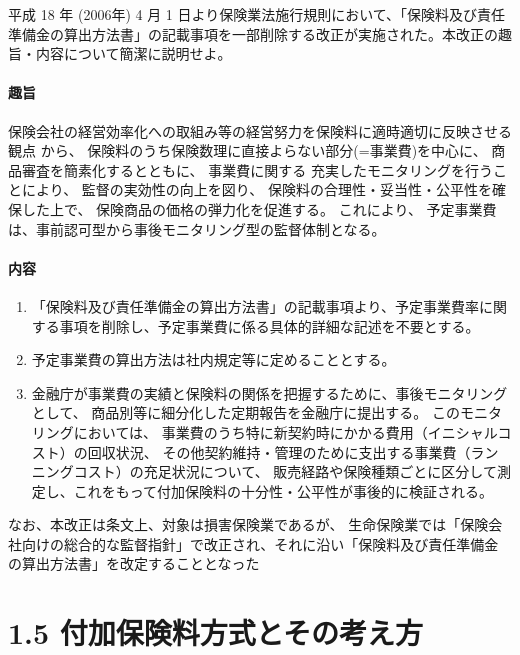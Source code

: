 \documentclass[report,gutter=10mm,fore-edge=10mm,uplatex,dvipdfmx]{jlreq}
\begin{document}

平成 18 年 (2006年) 4 月 1
日より保険業法施行規則において、「保険料及び責任準備金の算出方法書」の記載事項を一部削除する改正が実施された。本改正の趣旨・内容について簡潔に説明せよ。


\paragraph{趣旨}

  保険会社の経営効率化への取組み等の経営努力を保険料に適時適切に反映させる観点
から、 保険料のうち保険数理に直接よらない部分(=事業費)を中心に、
商品審査を簡素化するとともに、
事業費に関する      充実したモニタリングを行うことにより、
  監督の実効性の向上を図り、
  保険料の合理性・妥当性・公平性を確保した上で、
  保険商品の価格の弾力化を促進する。
これにより、  予定事業費は、事前認可型から事後モニタリング型の監督体制となる。

\paragraph{内容}

\begin{enumerate}
\tightlist
\item
  「保険料及び責任準備金の算出方法書」の記載事項より、予定事業費率に関する事項を削除し、予定事業費に係る具体的詳細な記述を不要とする。
\item
  予定事業費の算出方法は社内規定等に定めることとする。
\item
  金融庁が事業費の実績と保険料の関係を把握するために、事後モニタリングとして、
    商品別等に細分化した定期報告を金融庁に提出する。
    このモニタリングにおいては、
      事業費のうち特に新契約時にかかる費用（イニシャルコスト）の回収状況、
      その他契約維持・管理のために支出する事業費（ランニングコスト）の充足状況について、
販売経路や保険種類ごとに区分して測定し、これをもって付加保険料の十分性・公平性が事後的に検証される。
\end{enumerate}

  なお、本改正は条文上、対象は損害保険業であるが、
  生命保険業では「保険会社向けの総合的な監督指針」で改正され、それに沿い「保険料及び責任準備金の算出方法書」を改定することとなった


\section{1.5
付加保険料方式とその考え方}
\end{document}
